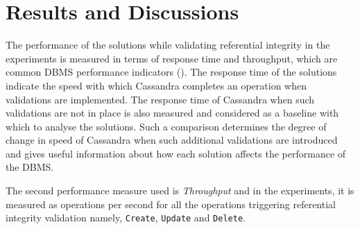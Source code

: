 \chapter{Results and Discussions}


The performance of the solutions while validating referential integrity in the
experiments is measured in terms of response time and throughput, which are
common \ac{DBMS} performance indicators ().
The response time of the solutions indicate the speed with which Cassandra
completes an operation when validations are implemented.
The response time of Cassandra when such validations
are not in place is also measured and considered as a baseline with which to
analyse the solutions. Such a comparison determines the degree of change in
speed of Cassandra when such additional validations are introduced and gives
 useful information about how each solution affects the performance of the
 \ac{DBMS}.

The second performance measure used is \textit{Throughput} and in the
experiments, it is measured as operations per second for all the operations
triggering referential integrity validation namely, \texttt{Create},
\texttt{Update} and \texttt{Delete}.


